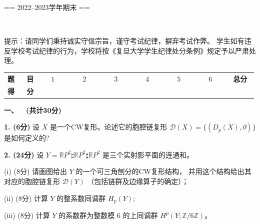 == 2022--2023学年期末 ==
\begin{center}
\end{center}
\\
\begin{center}
\end{center}
\qquad 提示：请同学们秉持诚实守信宗旨，谨守考试纪律，摒弃考试作弊。
学生如有违反学校考试纪律的行为，学校将按《复旦大学学生纪律处分条例》规定予以严肃处理。
\begin{center}\begin{tabular}{cccccccc}
\textbf{题\ \ \ 目} &\ \ \ $1$\ \ \ &\ \ \ $2$\ \ \ &\ \ \ $3$\ \ \ &\ \ \ $4$\ \ \ &\ \ \ $5$\ \ \ &\ \ \ $6$\ \ \ &\ \textbf{总分}\ \\
\textbf{得\ \ \ 分} & & & & & & & 
\end{tabular}\end{center}

\textbf{一、\ \ (共计30分)}

\textbf{1. (6分)} 设 $X$ 是一个CW复形。论述它的胞腔链复形 $\mathcal{D}(X)=\{\left(D_{p}(X), \partial\right)\}$ 是如何定义的?

\textbf{2. (24分)} 设 $Y=\mathbb{R} P^{2} \sharp \mathbb{R} P^{2} \sharp \mathbb{R} P^{2}$ 是三个实射影平面的连通和。

(i) (8分) 请画图给出 $Y$ 的一个可三角刨分的CW复形结构，
并用这个结构给出其对应的胞腔链复形 $\mathcal{D}(Y)$ （包括链群及边缘算子的确定）；

(ii) (8分) 计算 $Y$ 的整系数同调群 $H_{p}(Y)$;

(iii) (8分) 计算 $Y$ 的系数群为整数模 $6$ 的上同调群 $H^{p}(Y ; \mathbb{Z} / 6 \mathbb{Z})$。

